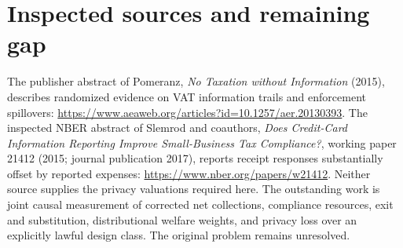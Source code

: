\documentclass[11pt]{article}
\begin{document}
\section*{Inspected sources and remaining gap}
The publisher abstract of Pomeranz, \emph{No Taxation without Information} (2015), describes randomized evidence on VAT information trails and enforcement spillovers:
\url{https://www.aeaweb.org/articles?id=10.1257/aer.20130393}.
The inspected NBER abstract of Slemrod and coauthors, \emph{Does Credit-Card Information Reporting Improve Small-Business Tax Compliance?}, working paper 21412 (2015; journal publication 2017), reports receipt responses substantially offset by reported expenses:
\url{https://www.nber.org/papers/w21412}.
Neither source supplies the privacy valuations required here. The outstanding work is joint causal measurement of corrected net collections, compliance resources, exit and substitution, distributional welfare weights, and privacy loss over an explicitly lawful design class. The original problem remains unresolved.
\end{document}
